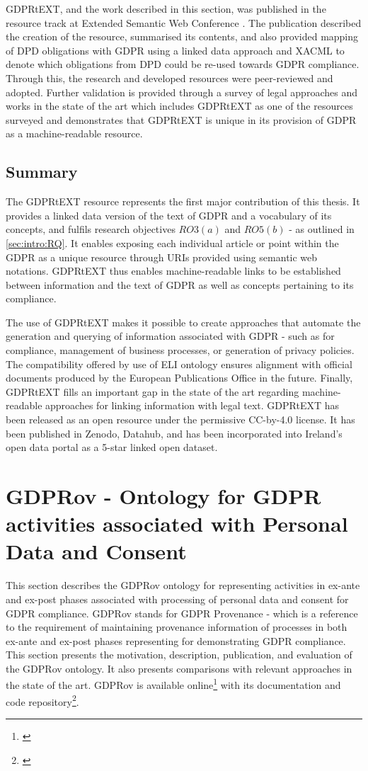 GDPRtEXT, and the work described in this section, was published in the resource track at Extended Semantic Web Conference \cite{}. The publication described the creation of the resource, summarised its contents, and also provided mapping of DPD obligations with GDPR using a linked data approach and XACML to denote which obligations from DPD could be re-used towards GDPR compliance. Through this, the research and developed resources were peer-reviewed and adopted.
Further validation is provided through a survey of legal approaches and works in the state of the art \cite{} which includes GDPRtEXT as one of the resources surveyed and demonstrates that GDPRtEXT is unique in its provision of GDPR as a machine-readable resource.

\subsection*{Summary}
The GDPRtEXT resource represents the first major contribution of this thesis. It provides a linked data version of the text of GDPR and a vocabulary of its concepts, and fulfils research objectives $RO3(a)$ and $RO5(b)$ - as outlined in \autoref{sec:intro:RQ}. It enables exposing each individual article or point within the GDPR as a unique resource through URIs provided using semantic web notations.
GDPRtEXT thus enables machine-readable links to be established between information and the text of GDPR as well as concepts pertaining to its compliance.

The use of GDPRtEXT makes it possible to create approaches that automate the generation and querying of information associated with GDPR - such as for compliance, management of business processes, or generation of privacy policies. The compatibility offered by use of ELI ontology ensures alignment with official documents produced by the European Publications Office in the future.
Finally, GDPRtEXT fills an important gap in the state of the art regarding machine-readable approaches for linking information with legal text.
GDPRtEXT has been released as an open resource under the permissive CC-by-4.0 license. It has been published in Zenodo, Datahub, and has been incorporated into Ireland’s open data portal as a 5-star linked open dataset.

\section{GDPRov - Ontology for GDPR activities associated with Personal Data and Consent}\label{sec:voc:GDPRov}
This section describes the GDPRov ontology for representing activities in ex-ante and ex-post phases associated with processing of personal data and consent for GDPR compliance. GDPRov stands for GDPR Provenance - which is a reference to the requirement of maintaining provenance information of processes in both ex-ante and ex-post phases representing for demonstrating GDPR compliance. This section presents the motivation, description, publication, and evaluation of the GDPRov ontology. It also presents comparisons with relevant approaches in the state of the art. GDPRov is available online\footnote{\url{}} with its documentation and code repository\footnote{\url{}}.

